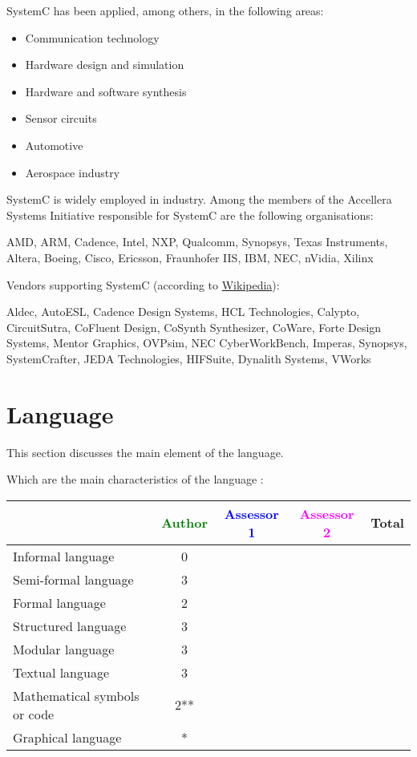 SystemC has been applied, among others, in the following areas:

\begin{itemize}
	\item Communication technology
	\item Hardware design and simulation
	\item Hardware and software synthesis
	\item Sensor circuits
	\item Automotive
	\item Aerospace industry
\end{itemize}

SystemC is widely employed in industry. Among the members of the Accellera Systems Initiative responsible for SystemC are the following organisations:

AMD, ARM, Cadence, Intel, NXP, Qualcomm, Synopsys, Texas Instruments, Altera, Boeing, Cisco, Ericsson, Fraunhofer IIS, IBM, NEC, nVidia, Xilinx

Vendors supporting SystemC (according to \href{http://en.wikipedia.org/wiki/SystemC}{Wikipedia}):

Aldec, AutoESL, Cadence Design Systems, HCL Technologies, Calypto, CircuitSutra, CoFluent Design, CoSynth Synthesizer, CoWare, Forte Design Systems, Mentor Graphics, OVPsim, NEC CyberWorkBench, Imperas, Synopsys, SystemCrafter, JEDA Technologies, HIFSuite, Dynalith Systems, VWorks


\section{Language}
This section discusses the main element of the language.

Which are the main characteristics of the language :

\begin{tabular}{|l | c | c | c | c|}
\hline
& \textcolor{green}{Author} & \textcolor{blue}{Assessor 1} & \textcolor{magenta}{Assessor 2} & Total \\
\hline 
Informal language &0 & & &  \\
\hline 
Semi-formal language &3 & & &  \\
\hline
Formal language &2 & & &  \\
\hline
Structured language &3 & & & \\
\hline
Modular language &3 & & & \\
\hline
Textual language &3 & & & \\
\hline
Mathematical symbols or code &2** & & & \\
\hline
Graphical language &* & & & \\
\hline
\end{tabular}

